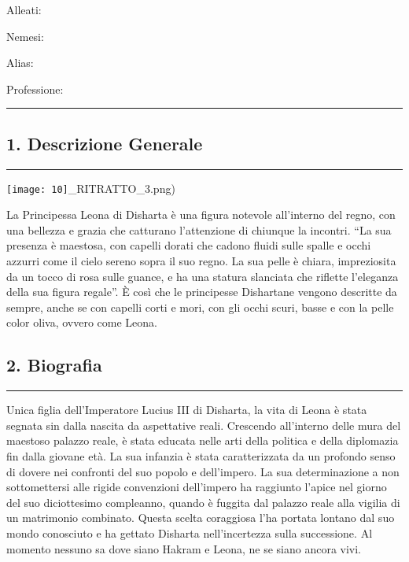 Alleati:

Nemesi:

Alias:

Professione:

\begin{center}\rule{0.5\linewidth}{0.5pt}\end{center}

\subsection{1. Descrizione Generale}\label{descrizione-generale}

\begin{center}\rule{0.5\linewidth}{0.5pt}\end{center}

\texttt{[image: 10]}\_RITRATTO\_3.png)

La Principessa Leona di Disharta è una figura notevole all'interno del
regno, con una bellezza e grazia che catturano l'attenzione di chiunque
la incontri. ``La sua presenza è maestosa, con capelli dorati che cadono
fluidi sulle spalle e occhi azzurri come il cielo sereno sopra il suo
regno. La sua pelle è chiara, impreziosita da un tocco di rosa sulle
guance, e ha una statura slanciata che riflette l'eleganza della sua
figura regale''. È così che le principesse Dishartane vengono descritte
da sempre, anche se con capelli corti e mori, con gli occhi scuri, basse
e con la pelle color oliva, ovvero come Leona.

\subsection{2. Biografia}\label{biografia}

\begin{center}\rule{0.5\linewidth}{0.5pt}\end{center}

Unica figlia dell'Imperatore Lucius III di Disharta, la vita di Leona è
stata segnata sin dalla nascita da aspettative reali. Crescendo
all'interno delle mura del maestoso palazzo reale, è stata educata nelle
arti della politica e della diplomazia fin dalla giovane età. La sua
infanzia è stata caratterizzata da un profondo senso di dovere nei
confronti del suo popolo e dell'impero. La sua determinazione a non
sottomettersi alle rigide convenzioni dell'impero ha raggiunto l'apice
nel giorno del suo diciottesimo compleanno, quando è fuggita dal palazzo
reale alla vigilia di un matrimonio combinato. Questa scelta coraggiosa
l'ha portata lontano dal suo mondo conosciuto e ha gettato Disharta
nell'incertezza sulla successione. Al momento nessuno sa dove siano
Hakram e Leona, ne se siano ancora vivi.


